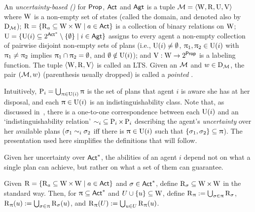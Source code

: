 \medskip

\begin{definition}\label{def:ults}
An \emph{uncertainty-based \lts (\ults)} for ${\rm \sf Prop}$, ${\rm \sf Act}$ and ${\rm \sf Agt}$ is a tuple $\mathcal{M} = \langle \operatorname{W},\operatorname{R},\operatorname{U},\operatorname{V} \rangle$ where $\operatorname{W}$ is a non-empty set of states (called the domain, and
denoted also by $\operatorname{D}_{\mathcal{M}}$);
$\operatorname{R} = \{ \operatorname{R}_a \subseteq \operatorname{W} \times \operatorname{W} \mid a \in {\rm \sf Act} \}$ is a
collection of binary relations on $\operatorname{W}$;
$\operatorname{U} = \{ \operatorname{U}(i) \subseteq 2^{{\rm \sf Act}^*}\setminus \{ \emptyset \} \mid i \in {\rm \sf Agt} \}$ assigns to every agent a non-empty collection of pairwise disjoint non-empty sets of plans (i.e., $\operatorname{U}(i) \neq \emptyset$, $\uppi_1, \uppi_2 \in \operatorname{U}(i)$ with $\uppi_1 \neq \uppi_2$ implies $\uppi_1 \cap \uppi_2 = \emptyset$, and $\emptyset \notin \operatorname{U}(i)$);
and $\operatorname{V}:\operatorname{W} \to 2^{\rm \sf Prop}$ is a labeling function. The tuple $\langle \operatorname{W},\operatorname{R},\operatorname{V} \rangle$ is called an LTS. 
Given an \ults $\mathcal{M}$ and $w \in \operatorname{D}_{\mathcal{M}}$, the pair $(\mathcal{M},w)$ (parenthesis usually dropped) is called a \emph{pointed \ults}.
\end{definition}
\medskip


Intuitively, $\operatorname{P}_{i} = \bigcup_{\uppi \in \operatorname{U}(i)} \uppi$ is the set of plans that agent $i$ is aware she has at her disposal, and each $\uppi \in \operatorname{U}(i)$ is an indistinguishability class. Note that, as discussed in~\cite{AFSVQ21}, there is a one-to-one correspondence between each $\operatorname{U}(i)$ and an `indistinguishability relation' ${\sim_i} \subseteq \operatorname{P}_{i} \times \operatorname{P}_{i}$ describing the agent's \emph{uncertainty} over her available plans ($\sigma_1 \sim_i \sigma_2$ iff there is $\uppi \in \operatorname{U}(i)$ such that $\{ \sigma_1, \sigma_2 \} \subseteq \uppi$). The presentation used here simplifies the definitions that will follow.

Given her uncertainty over ${\rm \sf Act}^*$, the abilities of an agent $i$ depend not on what a single plan can achieve, but rather on what a set of them can guarantee.

\medskip

\begin{definition}
Given $\operatorname{R}=\{ \operatorname{R}_a \subseteq \operatorname{W} \times \operatorname{W} \mid a\in{\rm \sf Act} \}$ and $\sigma \in {\rm \sf Act}^*$, define $\operatorname{R}_\sigma \subseteq \operatorname{W} \times \operatorname{W}$ in the standard way. Then, for $\uppi \subseteq {\rm \sf Act}^*$ and $U \cup \{u \} \subseteq \operatorname{W}$, define $\operatorname{R}_\uppi := \bigcup_{\sigma \in \uppi} \operatorname{R}_{\sigma}$, $\operatorname{R}_{\uppi}(u) := \bigcup_{\sigma \in \uppi} \operatorname{R}_\sigma(u)$, and $\operatorname{R}_{\uppi}(U) := \bigcup_{u \in U} \operatorname{R}_{\uppi}(u)$.
\end{definition}

